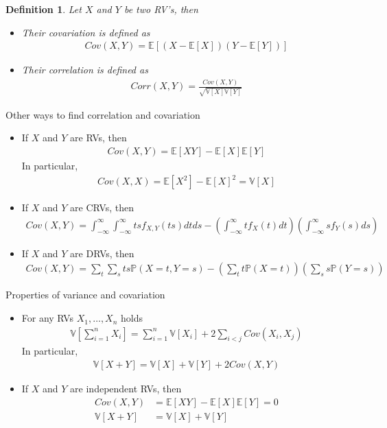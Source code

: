 \documentclass[10pt]{article}
\newtheorem*{definition}{Definition}
\begin{document}
\begin{definition} Let $X$ and $Y$ be two RV's, then
\begin{itemize}
\item Their covariation is defined as
\begin{align}
Cov(X,Y)=\mathbb{E}[(X-\mathbb{E}[X])(Y-\mathbb{E}[Y])]
\end{align}
\item Their correlation is defined as
\begin{align}
Corr(X,Y)=\frac{Cov(X,Y)}{\sqrt{\mathbb{V}[X]\mathbb{V}[Y]}}
\end{align}
\end{itemize}
\end{definition}

Other ways to find correlation and covariation

\begin{itemize}
\item If $X$ and $Y$ are RVs, then
\begin{align}
Cov(X, Y)=\mathbb{E}[XY]-\mathbb{E}[X]\mathbb{E}[Y]
\end{align}
In particular,
\begin{align}
Cov(X,X)=\mathbb{E}[X^2]-\mathbb{E}[X]^2=\mathbb{V}[X]
\end{align}
\item If $X$ and $Y$ are CRVs, then
\begin{align}
Cov(X,Y)=\int_{-\infty}^{\infty}\int_{-\infty}^{\infty} ts f_{X,Y}(ts)dtds-\left(\int_{-\infty}^{\infty} tf_X(t)dt\right)\left(\int_{-\infty}^{\infty} sf_Y(s)ds\right)
\end{align}
\item If $X$ and $Y$ are DRVs, then
\begin{align}
Cov(X,Y)=\sum_t\sum_s ts \mathbb{P}(X=t,Y=s)-\left(\sum_t t\mathbb{P}(X=t)\right)\left(\sum_s s\mathbb{P}(Y=s)\right)
\end{align}
\end{itemize}

Properties of variance and covariation
\begin{itemize}
\item For any RVs $X_1,\ldots,X_n$ holds
\begin{align}
\mathbb{V}[\sum_{i=1}^n X_i]=\sum_{i=1}^n\mathbb{V}[X_i]+2\sum_{i<j}Cov(X_i,X_j)
\end{align}
In particular,
\begin{align}
\mathbb{V}[X+Y]=\mathbb{V}[X]+\mathbb{V}[Y]+2Cov(X, Y)
\end{align}
\item If $X$ and $Y$ are independent RVs, then
\begin{align}
Cov(X,Y)&=\mathbb{E}[XY]-\mathbb{E}[X]\mathbb{E}[Y]=0\\
\mathbb{V}[X+Y]&=\mathbb{V}[X]+\mathbb{V}[Y]
\end{align}
\end{itemize}
\end{document}
